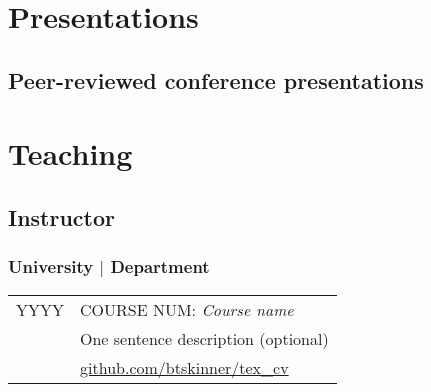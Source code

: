 \documentclass[11pt]{article}
\newcommand{\RR}{\raggedright\arraybackslash} %
\begin{document}


\section*{Presentations}
\subsection*{Peer-reviewed conference presentations}
\begin{refsection}
\nocite{*}
\printbibliography[heading = none,
keyword = conference,               %
keyword = peer,                     %
env = mybib,
check = recent]                     %
\end{refsection}                    %




\section*{Teaching}

\subsection*{Instructor}

\subsubsection*{University $\mid$ Department}
\begin{tabularx}{\linewidth}{>{\RR}p{1in}>{\RR}X}
YYYY&COURSE NUM: \textit{Course name} \\
&\hspace{1em}One sentence description (optional)  \\
&\hspace{1em}{\itshape Website/Course materials:}
\href{https://github.com/btskinner/tex\_cv}{github.com/btskinner/tex\_cv} \\
\end{tabularx}
\end{document}
